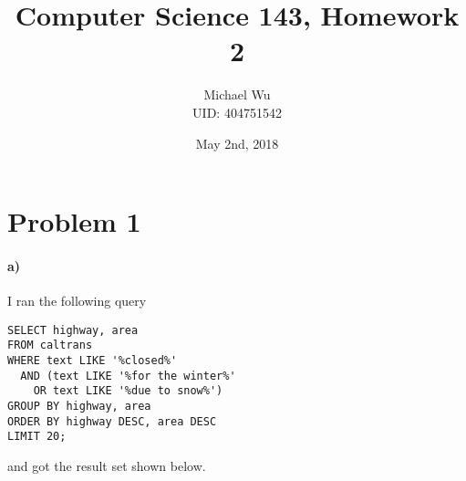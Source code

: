 \documentclass[12pt]{article}
\begin{document}
\title{Computer Science 143, Homework 2}
\date{May 2nd, 2018}
\author{Michael Wu\\UID: 404751542}
\maketitle

\section*{Problem 1}

\paragraph{a)}

I ran the following query
\begin{verbatim}
SELECT highway, area
FROM caltrans
WHERE text LIKE '%closed%'
  AND (text LIKE '%for the winter%'
    OR text LIKE '%due to snow%')
GROUP BY highway, area
ORDER BY highway DESC, area DESC
LIMIT 20;
\end{verbatim}
and got the result set shown below.
\end{document}
